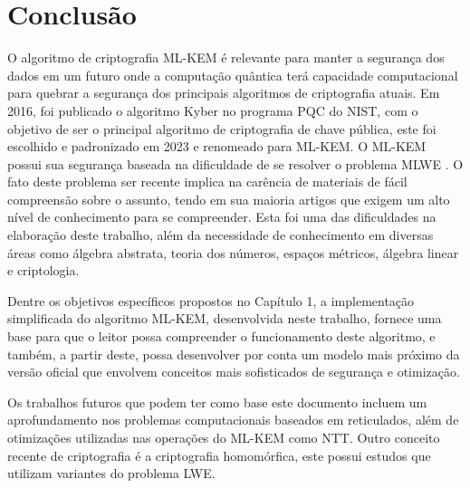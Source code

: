 \chapter{Conclusão}
\label{cap:consideracoes_parciais}
    O algoritmo de criptografia \ac{ML-KEM} é relevante para manter a segurança dos dados em um futuro onde a computação quântica terá capacidade computacional para quebrar a segurança dos principais algoritmos de criptografia atuais. Em 2016, foi publicado o algoritmo Kyber no programa \ac{PQC} do \ac{NIST}, com o objetivo de ser o principal algoritmo de criptografia de chave pública, este foi escolhido e padronizado em 2023 e renomeado para \ac{ML-KEM}. O \ac{ML-KEM} possui sua segurança baseada na dificuldade de se resolver o problema \ac{MLWE} \cite{module-lwe}. O fato deste problema ser recente implica na carência de materiais de fácil compreensão sobre o assunto, tendo em sua maioria artigos que exigem um alto nível de conhecimento para se compreender. Esta foi uma das dificuldades na elaboração deste trabalho, além da necessidade de conhecimento em diversas áreas como álgebra abstrata, teoria dos números, espaços métricos, álgebra linear e criptologia. 

    Dentre os objetivos específicos propostos no Capítulo 1, a implementação simplificada do algoritmo \ac{ML-KEM}, desenvolvida neste trabalho, fornece uma base para que o leitor possa compreender o funcionamento deste algoritmo, e também, a partir deste, possa desenvolver por conta um modelo mais próximo da versão oficial que envolvem conceitos mais sofisticados de segurança e otimização.

    Os trabalhos futuros que podem ter como base este documento incluem um aprofundamento nos problemas computacionais baseados em reticulados, além de otimizações utilizadas nas operações do \ac{ML-KEM} como \ac{NTT}. Outro conceito recente de criptografia é a criptografia homomórfica, este possui estudos que utilizam variantes do problema \ac{LWE}.